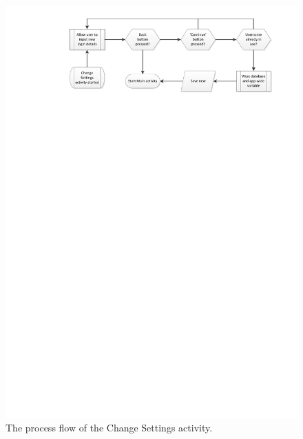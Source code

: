 \begin{figure}
 \centering 
 \includegraphics[clip = true, trim = 0 650 0 0,
 scale=0.7]{change_settings_processflow}
 \caption{The process flow of the Change Settings activity.}
 \label{fig:change-user-settings}
\end{figure}

